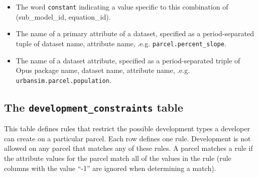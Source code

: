 \begin{itemize}

\item The word \verb|constant| indicating a value specific to this combination
of (sub_model_id, equation_id).

\item The name of a primary attribute of a dataset, specified as a period-separated
tuple of dataset name, attribute name, .e.g.
\verb|parcel.percent_slope|.

\item The name of a dataset attribute, specified as a period-separated triple of
Opus package name, dataset name, attribute name, .e.g. \verb|urbansim.parcel.population|.

\end{itemize}

\subsection{The {\tt development_constraints} table}

This table defines rules that restrict the possible development types a
developer can create on a particular parcel.  Each row defines one rule.
Development is not allowed on any parcel that matches any of these rules.  A
parcel matches a rule if the attribute values for the parcel match all of
the values in the rule (rule columns with the value ``-1'' are ignored when
determining a match).

